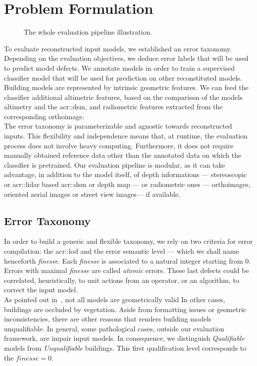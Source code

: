 \documentclass[runningheads]{llncs}
\begin{document}
\section{Problem Formulation}

\begin{figure}
	
	\caption{\label{fig::pipeline} The whole evaluation pipeline illustration.}
\end{figure}
To evaluate reconstructed input models, we established an error taxonomy. Depending on the evaluation objectives, we deduce error labels that will be used to predict model defects. We annotate models in order to train a supervised classifier model that will be used for prediction on other reconstituted models. Building models are represented by intrinsic geometric features. We can feed the classifier additional altimetric features, based on the comparison of the models altimetry and the \acrshort{acr::dsm}, and radiometric features extracted from the corresponding orthoimage.\\

The error taxonomy is parameterizable and agnostic towards reconstructed inputs. This flexibility and independence means that, at runtime, the evaluation process does not involve heavy computing. Furthermore, it does not require manually obtained reference data other than the annotated data on which the classifier is pretrained. Our evaluation pipeline is modular, as it can take advantage, in addition to the model itself, of depth informations --- stereoscopic or \acrfull{acr::lidar} based \acrshort{acr::dsm} or depth map  --- or radiometric ones --- orthoimages, oriented aerial images or street view images--- if available.
\subsection{Error Taxonomy}
In order to build a generic and flexible taxonomy, we rely on two criteria for error compilation: the \acrshort{acr::lod} and the error semantic level --- which we shall name henceforth \textit{finesse}. Each \textit{finesse} is associated to a natural integer starting from $0$. Errors with maximal \textit{finesse} are called \textit{atomic} errors. These last defects could be correlated, heuristically, to unit actions from an operator, or an algorithm, to correct the input model.\\

As pointed out in~\cite{ledoux2018val3dity}, not all models are geometrically valid In other cases, buildings are occluded by vegetation. Aside from formatting issues or geometric inconsistencies, there are other reasons that renders building models unqualifiable. In general, some pathological cases, outside our evaluation framework, are impair input models. In consequence, we distinguish \textit{Qualifiable} models from \textit{Unqualifiable} buildings. This first qualification level corresponds to the $\textit{finesse} = 0$.
\end{document}
